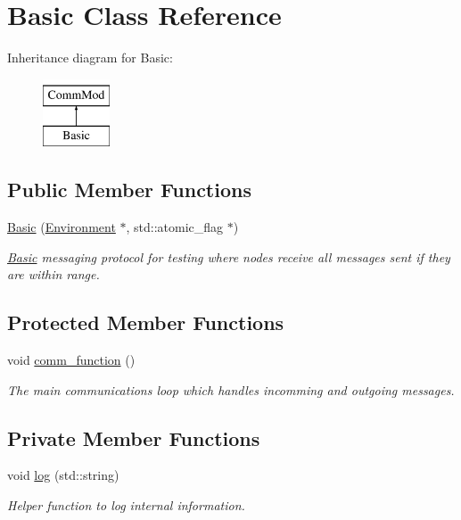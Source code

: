 \hypertarget{class_basic}{}\section{Basic Class Reference}
\label{class_basic}
Inheritance diagram for Basic\+:\begin{figure}[H]
\begin{center}
\leavevmode
\includegraphics[height=2.000000cm]{class_basic}
\end{center}
\end{figure}
\subsection*{Public Member Functions}
\begin{DoxyCompactItemize}
\item 
\hyperlink{class_basic_a07314fa25d6ae09c6f7db834f8b44305}{Basic} (\hyperlink{class_environment}{Environment} $\ast$, std\+::atomic\+\_\+flag $\ast$)\hypertarget{class_basic_a07314fa25d6ae09c6f7db834f8b44305}{}\label{class_basic_a07314fa25d6ae09c6f7db834f8b44305}

\begin{DoxyCompactList}\small\item\em \hyperlink{class_basic}{Basic} messaging protocol for testing where nodes receive all messages sent if they are within range. \end{DoxyCompactList}\end{DoxyCompactItemize}
\subsection*{Protected Member Functions}
\begin{DoxyCompactItemize}
\item 
void \hyperlink{class_basic_a736b2bb76e936ed7f5cb20b6c166b76a}{comm\+\_\+function} ()
\begin{DoxyCompactList}\small\item\em The main communications loop which handles incomming and outgoing messages. \end{DoxyCompactList}\end{DoxyCompactItemize}
\subsection*{Private Member Functions}
\begin{DoxyCompactItemize}
\item 
void \hyperlink{class_basic_aa8a33a9f24b0750579c27a5214368e35}{log} (std\+::string)
\begin{DoxyCompactList}\small\item\em Helper function to log internal information. \end{DoxyCompactList}\end{DoxyCompactItemize}
